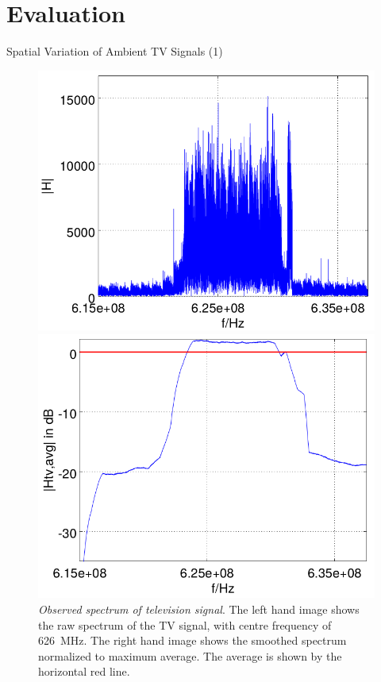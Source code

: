 \documentclass[apectratio=169]{beamer}
\begin{document}
\section{Evaluation}
\begin{frame}{Spatial Variation of Ambient TV Signals (1)}
\begin{figure}[h]
	\centering
	\begin{minipage}{0.49\columnwidth}
		\includegraphics[width=\columnwidth]{./fig/626mhz_raw}
	\end{minipage}
	\hfill
	\begin{minipage}{0.49\columnwidth}
		\includegraphics[width=\columnwidth]{./fig/626mhz_filtered}
	\end{minipage}
	\caption{\emph{Observed spectrum of television signal}. The left hand image shows the raw spectrum of the TV signal, with centre frequency of \SI{626}{\mega\hertz}. The right hand image shows the smoothed spectrum normalized to maximum average. The average is  shown by the horizontal red line.}
	\label{fig:tv_record} 
	\end{figure}
\end{frame}
\end{document}
